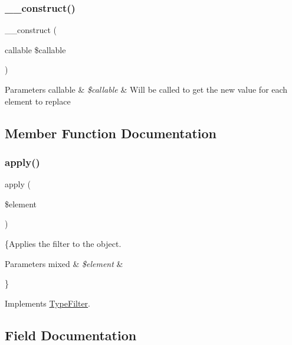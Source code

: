 \subsubsection{\texorpdfstring{\+\_\+\+\_\+construct()}{\_\_construct()}}
{\footnotesize\ttfamily \+\_\+\+\_\+construct (\begin{DoxyParamCaption}\item[{callable}]{\$callable }\end{DoxyParamCaption})}


\begin{DoxyParams}[1]{Parameters}
callable & {\em \$callable} & Will be called to get the new value for each element to replace \\
\hline
\end{DoxyParams}


\subsection{Member Function Documentation}
\mbox{\label{class_deep_copy_1_1_type_filter_1_1_replace_filter_a959e75f8f2b305dcf33633745c338176}} 
\subsubsection{\texorpdfstring{apply()}{apply()}}
{\footnotesize\ttfamily apply (\begin{DoxyParamCaption}\item[{}]{\$element }\end{DoxyParamCaption})}

\{Applies the filter to the object.


\begin{DoxyParams}[1]{Parameters}
mixed & {\em \$element} & \\
\hline
\end{DoxyParams}
\} 

Implements \mbox{\hyperlink{interface_deep_copy_1_1_type_filter_1_1_type_filter_a959e75f8f2b305dcf33633745c338176}{Type\+Filter}}.



\subsection{Field Documentation}
\mbox{\label{class_deep_copy_1_1_type_filter_1_1_replace_filter_abc7c2ac0d93d22f71221e8b60512c860}} 
